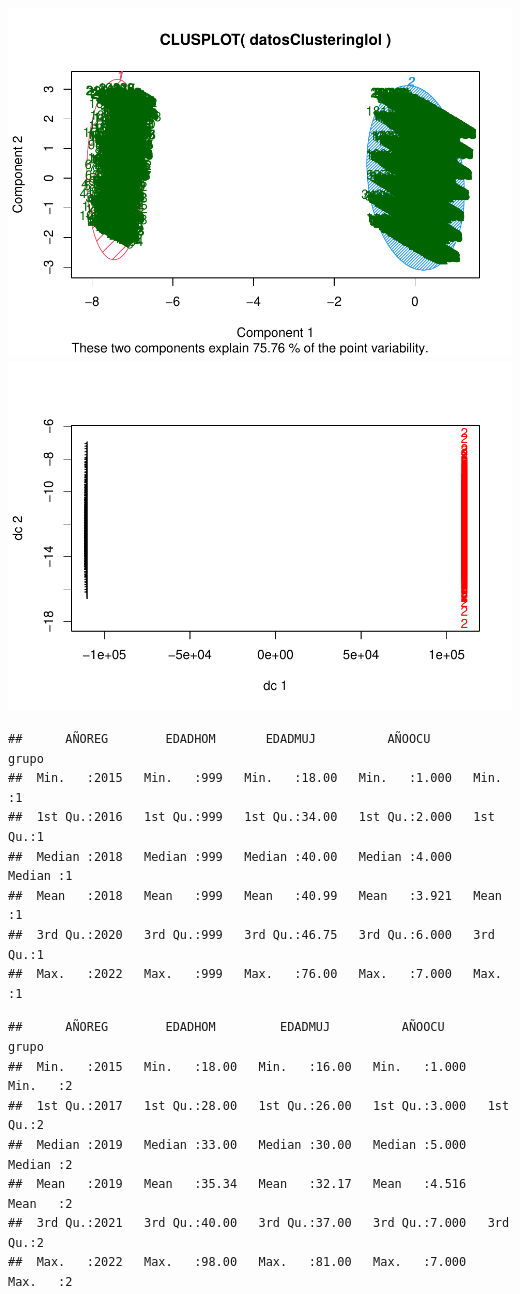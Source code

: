 \documentclass[
]{article}
\begin{document}
\includegraphics{Proyecto_files/figure-latex/fuzzy2-1.pdf}
\includegraphics{Proyecto_files/figure-latex/fuzzy2-2.pdf}

\begin{verbatim}
##      AÑOREG        EDADHOM       EDADMUJ          AÑOOCU          grupo  
##  Min.   :2015   Min.   :999   Min.   :18.00   Min.   :1.000   Min.   :1  
##  1st Qu.:2016   1st Qu.:999   1st Qu.:34.00   1st Qu.:2.000   1st Qu.:1  
##  Median :2018   Median :999   Median :40.00   Median :4.000   Median :1  
##  Mean   :2018   Mean   :999   Mean   :40.99   Mean   :3.921   Mean   :1  
##  3rd Qu.:2020   3rd Qu.:999   3rd Qu.:46.75   3rd Qu.:6.000   3rd Qu.:1  
##  Max.   :2022   Max.   :999   Max.   :76.00   Max.   :7.000   Max.   :1
\end{verbatim}

\begin{verbatim}
##      AÑOREG        EDADHOM         EDADMUJ          AÑOOCU          grupo  
##  Min.   :2015   Min.   :18.00   Min.   :16.00   Min.   :1.000   Min.   :2  
##  1st Qu.:2017   1st Qu.:28.00   1st Qu.:26.00   1st Qu.:3.000   1st Qu.:2  
##  Median :2019   Median :33.00   Median :30.00   Median :5.000   Median :2  
##  Mean   :2019   Mean   :35.34   Mean   :32.17   Mean   :4.516   Mean   :2  
##  3rd Qu.:2021   3rd Qu.:40.00   3rd Qu.:37.00   3rd Qu.:7.000   3rd Qu.:2  
##  Max.   :2022   Max.   :98.00   Max.   :81.00   Max.   :7.000   Max.   :2
\end{verbatim}
\end{document}
